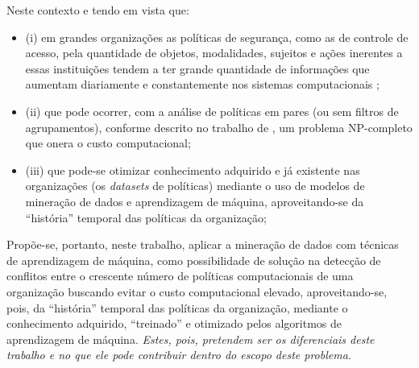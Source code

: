 \documentclass[
	12pt,				%
	openright,			%
	oneside,			%
	a4paper,			%
	english,			%
	french,				%
	spanish,			%
	brazil				%
	]{abntex2}
\begin{document}
Neste contexto e tendo em vista que: 
\begin{itemize}
	\item (i) em grandes organizações as políticas de segurança, como as de controle de acesso, pela quantidade de objetos, modalidades, sujeitos e ações inerentes a essas instituições tendem a ter grande quantidade de informações que aumentam diariamente e constantemente nos sistemas computacionais \cite{fugini_information_2004} \cite{bellettini_role_2001} \cite{ueda_tese_2012};
	\item (ii) que pode ocorrer, com a análise de políticas em pares (ou sem filtros de agrupamentos), conforme descrito no trabalho de , um problema NP-completo que onera o custo computacional;
	\item (iii) que pode-se otimizar conhecimento adquirido e já existente nas organizações (os \textit{datasets} de políticas) mediante o uso de modelos de mineração de dados e aprendizagem de máquina, aproveitando-se da ``história'' temporal das políticas da organização;
\end{itemize}  

Propõe-se, portanto, neste trabalho, aplicar a mineração de dados com técnicas de aprendizagem de máquina, como possibilidade de solução na detecção de conflitos entre o crescente número de políticas computacionais de uma organização %
buscando evitar o custo computacional elevado, aproveitando-se, pois, da ``história'' temporal das políticas da organização, mediante o conhecimento adquirido, ``treinado'' e otimizado pelos algoritmos de aprendizagem de máquina. \textit{Estes, pois, pretendem ser os diferenciais deste trabalho e no que ele pode contribuir dentro do escopo deste problema.}
\end{document}
